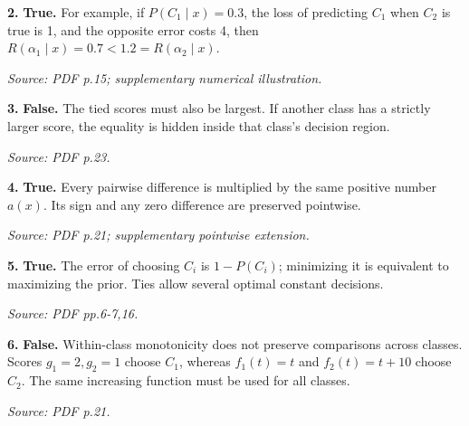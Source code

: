 \documentclass[11pt,a4paper]{article}
\begin{document}
\par\noindent\begin{minipage}{\linewidth}
\textbf{2.} \textbf{True.} For example, if \(P(C_1\mid x)=0.3\), the loss of predicting \(C_1\) when \(C_2\) is true is 1, and the opposite error costs 4, then \(R(\alpha_1\mid x)=0.7<1.2=R(\alpha_2\mid x)\).

{\footnotesize\textit{Source: PDF p.15; supplementary numerical illustration.}}
\end{minipage}\par\vspace{3mm}
\par\noindent\begin{minipage}{\linewidth}
\textbf{3.} \textbf{False.} The tied scores must also be largest. If another class has a strictly larger score, the equality is hidden inside that class's decision region.

{\footnotesize\textit{Source: PDF p.23.}}
\end{minipage}\par\vspace{3mm}
\par\noindent\begin{minipage}{\linewidth}
\textbf{4.} \textbf{True.} Every pairwise difference is multiplied by the same positive number \(a(x)\). Its sign and any zero difference are preserved pointwise.

{\footnotesize\textit{Source: PDF p.21; supplementary pointwise extension.}}
\end{minipage}\par\vspace{3mm}
\par\noindent\begin{minipage}{\linewidth}
\textbf{5.} \textbf{True.} The error of choosing \(C_i\) is \(1-P(C_i)\); minimizing it is equivalent to maximizing the prior. Ties allow several optimal constant decisions.

{\footnotesize\textit{Source: PDF pp.6-7,16.}}
\end{minipage}\par\vspace{3mm}
\par\noindent\begin{minipage}{\linewidth}
\textbf{6.} \textbf{False.} Within-class monotonicity does not preserve comparisons across classes. Scores \(g_1=2,g_2=1\) choose \(C_1\), whereas \(f_1(t)=t\) and \(f_2(t)=t+10\) choose \(C_2\). The same increasing function must be used for all classes.

{\footnotesize\textit{Source: PDF p.21.}}
\end{minipage}\par\vspace{3mm}
\end{document}
